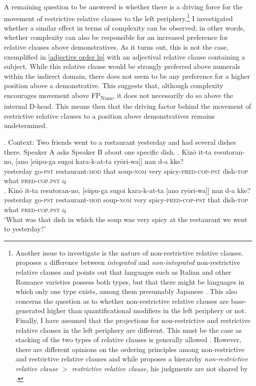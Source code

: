 A remaining question to be answered is whether there is a driving force for the movement of restrictive relative clauses to the left periphery.\footnote{Another issue to investigate is the nature of non-restrictive relative clauses. \citet{cinque:2008:two} proposes a difference between \textit{integrated} and \textit{non-integrated} non-restrictive relative clauses and points out that languages such as Italian and other Romance varieties possess both types, but that there might be languages in which only one type exists, among them presumably Japanese \citep[121–124]{cinque:2008:two}. This also concerns the question as to whether non-restrictive relative clauses are base-generated higher than quantificational modifiers in the left periphery or not. Finally, I have assumed that the projections for non-restrictive and restrictive relative clauses in the left periphery are different. This must be the case as stacking of the two types of relative clauses is generally allowed \citep{cinque:2008:two, ishizuka:2008:RC}. However, there are different opinions on the ordering principles among non-restrictive and restrictive relative clauses and while \citet{cinque:2008:two} proposes a hierarchy \textit{non-restrictive relative clause} $>$ \textit{restrictive relative clause}, his judgments are not shared by \citet{ishizuka:2008:RC}.} I investigated whether a similar effect in terms of complexity can be observed; in other words, whether complexity can also be responsible for an increased preference for relative clauses above demonstratives. As it turns out, this is not the case, exemplified in \ref{adjective order lp} with an adjectival relative clause containing a subject. While this relative clause would be strongly preferred above numerals within the indirect domain, there does not seem to be any preference for a higher position above a demonstrative. This suggests that, although complexity encourages movement above FP\textsubscript{Num}, it does not necessarily do so above the internal D-head. This means then that the driving factor behind the movement of restrictive relative clauses to a position above demonstratives remains undetermined.

\ex. \label{adjective order lp} Context: Two friends went to a restaurant yesterday and had several dishes there. Speaker A asks Speaker B about one specific dish.
 \ag. Kinō it-ta resutoran-no, [ano [sūpu-ga sugoi kara-k-at-ta ryōri-wa]] nan d-a kke?\\
yesterday go-\textsc{pst} restaurant-\textsc{mod} that soup-\textsc{nom} very spicy-\textsc{pred-cop-pst} dish-\textsc{top} what \textsc{pred-cop.pst} \textsc{q} \\
\bg. Kinō it-ta resutoran-no, [sūpu-ga sugoi kara-k-at-ta [ano ryōri-wa]] nan d-a kke?\\
yesterday go-\textsc{pst} restaurant-\textsc{mod} soup-\textsc{nom} very spicy-\textsc{pred-cop-pst} that dish-\textsc{top} what \textsc{pred-cop.pst} \textsc{q}\\
`What was that dish in which the soup was very spicy at the restaurant we went to yesterday?’

